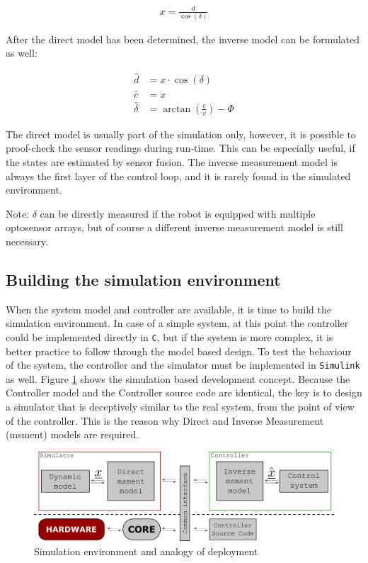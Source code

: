 \begin{align}
    x = \frac{d}{\cos(\delta)}
\end{align}

After the direct model has been determined, the inverse model can be formulated as well:

\begin{align}
    \hat{d} &= x \cdot \cos(\delta) \\
    \hat{c} &=\dot{x} \\
    \hat{\delta} &= \arctan \left(\frac{c}{v}\right) - \Phi
\end{align}

The direct model is usually part of the simulation only, however, it is possible to proof-check the sensor readings during run-time. This can be especially useful, if the states are estimated by sensor fusion. The inverse measurement model is always the first layer of the control loop, and it is rarely found in the simulated environment.

Note: $\delta$ can be directly measured if the robot is equipped with multiple optosensor arrays, but of course a different inverse measurement model is still necessary.

\subsection{Building the simulation environment}

When the system model and controller are available, it is time to build the simulation environment. In case of a simple system, at this point the controller could be implemented directly in \verb!C!, but if the system is more complex, it is better practice to follow through the model based design. To test the behaviour of the system, the controller and the simulator must be implemented in \verb!Simulink! as well. Figure \ref{fig:simenvironment} shows the simulation based development concept. Because the Controller model and the Controller source code are identical, the key is to design a simulator that is deceptively similar to the real system, from the point of view of the controller. This is the reason why Direct and Inverse Measurement (msment) models are required.

\begin{figure}[!ht]
    \centering
    \includegraphics[width=0.7\linewidth]{img/simenvironment}
    \centering
    \caption{Simulation environment and analogy of deployment}
    \label{fig:simenvironment}
\end{figure}

